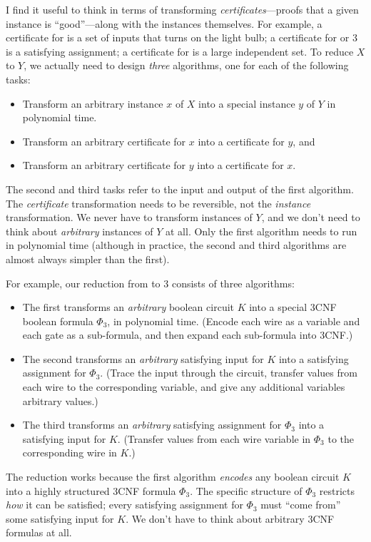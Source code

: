 I find it useful to think in terms of transforming \textit{certificates}---proofs that a given instance is “good”---along with the instances themselves.
For example, a certificate for  is a set of inputs that turns on the light bulb; a certificate for  or 3 is a satisfying assignment; a certificate for  is a large independent set.
To reduce $X$ to $Y$, we actually need to design \textit{three} algorithms, one for each of the following tasks:
\begin{itemize}
\item Transform an arbitrary instance $x$ of $X$ into a special instance $y$ of $Y$ in polynomial time.
\item Transform an arbitrary certificate for $x$ into a certificate for $y$, and
\item Transform an arbitrary certificate for $y$ into a certificate for $x$.
\end{itemize}
The second and third tasks refer to the input and output of the first algorithm.
The \textit{certificate} transformation needs to be reversible, not the \textit{instance} transformation.
We never have to transform instances of $Y$, and we don’t need to think about \textit{arbitrary} instances of $Y$ at all.
Only the first algorithm needs to run in polynomial time (although in practice, the second and third algorithms are almost always simpler than the first).

For example, our reduction from  to 3 consists of three algorithms:
\begin{itemize}
\item The first transforms an \textit{arbitrary} boolean circuit $K$ into a special 3CNF boolean formula $\Phi_3$, in polynomial time.
(Encode each wire as a variable and each gate as a sub-formula, and then expand each sub-formula into 3CNF.)
\item The second transforms an \textit{arbitrary} satisfying input for $K$ into a satisfying assignment for $\Phi_3$.
(Trace the input through the circuit, transfer values from each wire to the corresponding variable, and give any additional variables arbitrary values.)
\item The third transforms an \textit{arbitrary} satisfying assignment for $\Phi_3$ into a satisfying input for $K$.
(Transfer values from each wire variable in $\Phi_3$ to the corresponding wire in $K$.)
\end{itemize}
The reduction works because the first algorithm \textit{encodes} any boolean circuit $K$ into a highly structured 3CNF formula $\Phi_3$.
The specific structure of $\Phi_3$ restricts \textit{how} it can be satisfied; every satisfying assignment for $\Phi_3$ must “come from” some satisfying input for $K$.
We don’t have to think about arbitrary 3CNF formulas at all.

